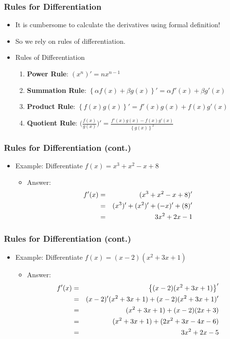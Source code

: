 \documentclass[pdflatex, 12pt]{beamer}
\begin{document}
\begin{frame}
\frametitle{Rules for Differentiation}
\begin{itemize}
\item It is cumbersome to calculate the derivatives using formal definition!
\vspace{0.4cm}
\item So we rely on rules of differentiation.
\vspace{0.4cm}
\item Rules of Differentiation
 \begin{enumerate}
 \item \textbf{Power Rule}: $(x^n)' = nx^{n - 1}$
 \item \textbf{Summation Rule}: $\left\{\alpha f(x) + \beta g(x)\right\}' = \alpha f'(x) + \beta g'(x)$
 \item \textbf{Product Rule}: $\left\{f(x)g(x)\right\}' = f'(x)g(x) + f(x)g'(x)$
 \item \textbf{Quotient Rule}: $\big(\frac{f(x)}{g(x)}\big)' = \frac{f'(x)g(x) - f(x)g'(x)}{\left\{g(x)\right\}^2}$
 \end{enumerate}
\end{itemize}
\end{frame}

\begin{frame}
\frametitle{Rules for Differentiation (cont.)}
\begin{itemize}
\item Example: Differentiate $f(x) = x^3 + x^2 - x + 8$
\vspace{0.4cm}
 \begin{itemize}
 \item Answer: 
  \begin{eqnarray}
  f'(x) &=& (x^3 + x^2 - x + 8)' \notag \\
  &=& (x^3)' + (x^2)' + (-x)' + (8)' \notag \\
  &=& 3x^2 + 2x - 1 \notag
  \end{eqnarray}
 \end{itemize}
\end{itemize}
\end{frame}

\begin{frame}
\frametitle{Rules for Differentiation (cont.)}
\begin{itemize}
\item Example: Differentiate $f(x) = (x - 2)(x^2 + 3x + 1)$
\vspace{0.4cm}
 \begin{itemize}
 \item Answer: 
 \begin{eqnarray}
 f'(x) &=& \left\{(x - 2)(x^2 + 3x + 1)\right\}' \notag \\
 &=& (x - 2)'(x^2 + 3x + 1) + (x - 2)(x^2 + 3x + 1)' \notag \\
 &=& (x^2 + 3x + 1) + (x - 2)(2x + 3) \notag \\
 &=& (x^2 + 3x + 1) + (2x^2 + 3x - 4x - 6) \notag \\
 &=& 3x^2 + 2x - 5 \notag
 \end{eqnarray}
 \end{itemize}
\end{itemize}
\end{frame}	
\end{document}
